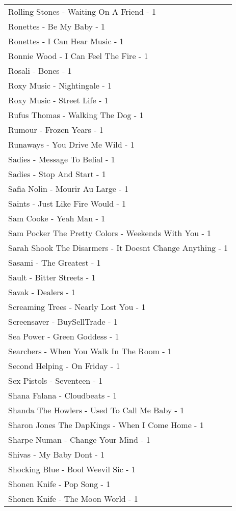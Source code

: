 \documentclass[
]{article}
\begin{document}
\begin{longtable}{l}
Rolling Stones - Waiting On A Friend - 1 \\ 
Ronettes - Be My Baby - 1 \\ 
Ronettes - I Can Hear Music - 1 \\ 
Ronnie Wood - I Can Feel The Fire - 1 \\ 
Rosali - Bones - 1 \\ 
Roxy Music - Nightingale - 1 \\ 
Roxy Music - Street Life - 1 \\ 
Rufus Thomas - Walking The Dog - 1 \\ 
Rumour - Frozen Years - 1 \\ 
Runaways - You Drive Me Wild - 1 \\ 
Sadies - Message To Belial - 1 \\ 
Sadies - Stop And Start - 1 \\ 
Safia Nolin - Mourir Au Large - 1 \\ 
Saints - Just Like Fire Would - 1 \\ 
Sam Cooke - Yeah Man - 1 \\ 
Sam Pocker The Pretty Colors - Weekends With You - 1 \\ 
Sarah Shook The Disarmers - It Doesnt Change Anything - 1 \\ 
Sasami - The Greatest - 1 \\ 
Sault - Bitter Streets - 1 \\ 
Savak - Dealers - 1 \\ 
Screaming Trees - Nearly Lost You - 1 \\ 
Screensaver - BuySellTrade - 1 \\ 
Sea Power - Green Goddess - 1 \\ 
Searchers - When You Walk In The Room - 1 \\ 
Second Helping - On Friday - 1 \\ 
Sex Pistols - Seventeen - 1 \\ 
Shana Falana - Cloudbeats - 1 \\ 
Shanda The Howlers - Used To Call Me Baby - 1 \\ 
Sharon Jones The DapKings - When I Come Home - 1 \\ 
Sharpe Numan - Change Your Mind - 1 \\ 
Shivas - My Baby Dont - 1 \\ 
Shocking Blue - Bool Weevil Sic - 1 \\ 
Shonen Knife - Pop Song - 1 \\ 
Shonen Knife - The Moon World - 1 \\ 

\end{longtable}
\end{document}
